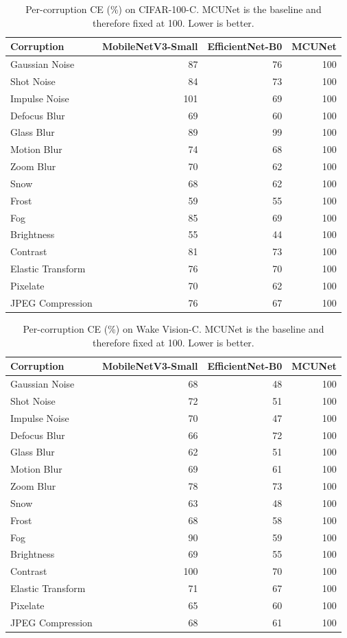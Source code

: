 \documentclass[runningheads]{llncs}
\begin{document}
\begin{table}[p]
\caption{Per-corruption CE (\%) on CIFAR-100-C. MCUNet is the baseline and therefore fixed at 100. Lower is better.}
\label{tab:cifar100_ce}
\centering
\scriptsize
\begin{tabular}{lrrr}
\toprule
Corruption & MobileNetV3-Small & EfficientNet-B0 & MCUNet \\
\midrule
Gaussian Noise & 87 & 76 & 100 \\
Shot Noise & 84 & 73 & 100 \\
Impulse Noise & 101 & 69 & 100 \\
Defocus Blur & 69 & 60 & 100 \\
Glass Blur & 89 & 99 & 100 \\
Motion Blur & 74 & 68 & 100 \\
Zoom Blur & 70 & 62 & 100 \\
Snow & 68 & 62 & 100 \\
Frost & 59 & 55 & 100 \\
Fog & 85 & 69 & 100 \\
Brightness & 55 & 44 & 100 \\
Contrast & 81 & 73 & 100 \\
Elastic Transform & 76 & 70 & 100 \\
Pixelate & 70 & 62 & 100 \\
JPEG Compression & 76 & 67 & 100 \\
\bottomrule
\end{tabular}
\end{table}

\begin{table}[p]
\caption{Per-corruption CE (\%) on Wake Vision-C. MCUNet is the baseline and therefore fixed at 100. Lower is better.}
\label{tab:wake_ce}
\centering
\scriptsize
\begin{tabular}{lrrr}
\toprule
Corruption & MobileNetV3-Small & EfficientNet-B0 & MCUNet \\
\midrule
Gaussian Noise & 68 & 48 & 100 \\
Shot Noise & 72 & 51 & 100 \\
Impulse Noise & 70 & 47 & 100 \\
Defocus Blur & 66 & 72 & 100 \\
Glass Blur & 62 & 51 & 100 \\
Motion Blur & 69 & 61 & 100 \\
Zoom Blur & 78 & 73 & 100 \\
Snow & 63 & 48 & 100 \\
Frost & 68 & 58 & 100 \\
Fog & 90 & 59 & 100 \\
Brightness & 69 & 55 & 100 \\
Contrast & 100 & 70 & 100 \\
Elastic Transform & 71 & 67 & 100 \\
Pixelate & 65 & 60 & 100 \\
JPEG Compression & 68 & 61 & 100 \\
\bottomrule
\end{tabular}
\end{table}
\end{document}
